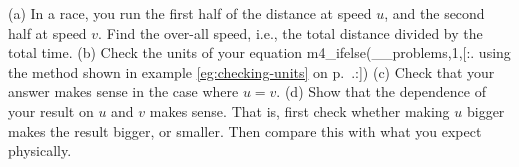 (a) In a race, you run the first half of the distance at speed $u$,
and the second half at speed $v$. Find the over-all speed, i.e.,
the total distance divided by the total time.\answercheck\hwendpart
%
(b) Check the units of your equation%
m4_ifelse(__problems,1,[:.%
using the method shown in example \ref{eg:checking-units} on p.~\pageref{eg:checking-units}.:])
\hwendpart
%
(c) Check that your answer makes sense in the case where $u=v$.\hwendpart
%
(d) Show that the dependence of your result on $u$ and $v$ makes sense. That is, first
check whether making $u$ bigger makes the result bigger, or smaller. Then compare this
with what you expect physically.
